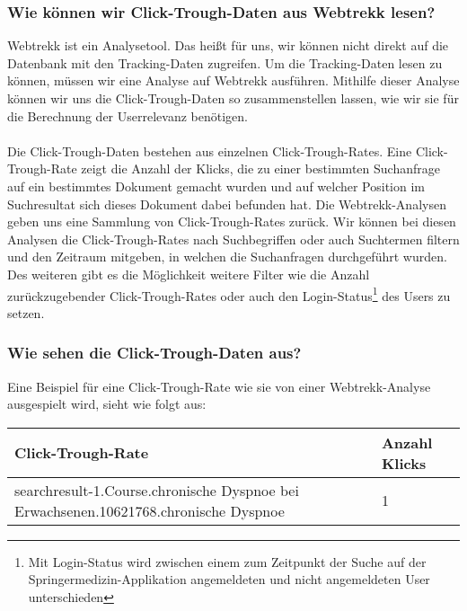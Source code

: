 \subsubsection{Wie können wir Click-Trough-Daten aus Webtrekk lesen?}
\label{sec:Grundlagen:Grundbegriffe:Click-Trough-Daten:LesenClick-Trough-Daten}

Webtrekk ist ein Analysetool. Das heißt für uns, wir können nicht direkt auf die Datenbank mit den Tracking-Daten zugreifen. Um die Tracking-Daten lesen zu können, müssen wir eine Analyse auf Webtrekk ausführen. Mithilfe dieser Analyse können wir uns die Click-Trough-Daten so zusammenstellen lassen, wie wir sie für die Berechnung der Userrelevanz benötigen.
\\
\\
Die Click-Trough-Daten bestehen aus einzelnen Click-Trough-Rates. Eine Click-Trough-Rate zeigt die Anzahl der Klicks, die zu einer bestimmten Suchanfrage auf ein bestimmtes Dokument gemacht wurden und auf welcher Position im Suchresultat sich dieses Dokument dabei befunden hat. Die Webtrekk-Analysen geben uns eine Sammlung von Click-Trough-Rates zurück. Wir können bei diesen Analysen die Click-Trough-Rates nach Suchbegriffen oder auch Suchtermen filtern und den Zeitraum mitgeben, in welchen die Suchanfragen durchgeführt wurden. Des weiteren gibt es die Möglichkeit weitere Filter wie die Anzahl zurückzugebender Click-Trough-Rates oder auch den \glqq Login-Status\footnote{Mit Login-Status wird zwischen einem zum Zeitpunkt der Suche auf der Springermedizin-Applikation angemeldeten und nicht angemeldeten User unterschieden} des Users\grqq{} zu setzen. 

\subsubsection{Wie sehen die Click-Trough-Daten aus?}
\label{sec:Grundlagen:Grundbegriffe:Click-Trough-Daten:AussehenClick-Trough-Daten}

Eine Beispiel für eine Click-Trough-Rate wie sie von einer Webtrekk-Analyse ausgespielt wird, sieht wie folgt aus:

\begin{tabular}{|p{}|p{}|}\hline
	\textbf{Click-Trough-Rate} & \textbf{Anzahl Klicks} \\ \hline
	searchresult-1.Course.chronische Dyspnoe bei Erwachsenen.10621768.chronische Dyspnoe & 1 \\ \hline
 \end{tabular}

